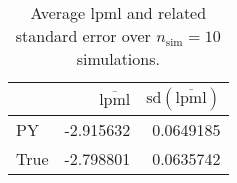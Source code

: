 \begin{table}[H]

\caption{Average lpml and related standard error over $n_{\text{sim}} = 10$ simulations.}
\centering
\begin{tabular}[t]{lrr}
\toprule
  & $\overbar{\text{lpml}}$ & $\text{sd}(\overbar{\text{lpml}})$\\
\midrule
PY & -2.915632 & 0.0649185\\
True & -2.798801 & 0.0635742\\
\bottomrule
\end{tabular}
\end{table}